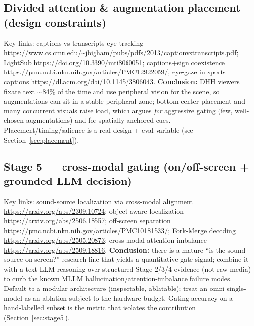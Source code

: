\documentclass[11pt,a4paper]{article}
\begin{document}
\subsection*{Divided attention \& augmentation placement (design constraints)}
Key links: captions vs transcripts eye-tracking
\url{https://www.cs.cmu.edu/~jbigham/pubs/pdfs/2013/captionvstranscripts.pdf}; LightSub
\url{https://doi.org/10.3390/mti8060051}; captions+sign coexistence
\url{https://pmc.ncbi.nlm.nih.gov/articles/PMC12922059/}; eye-gaze in sports captions
\url{https://dl.acm.org/doi/10.1145/3806043}.
\textbf{Conclusion:} DHH viewers fixate text $\sim$84\% of the time and use peripheral vision for the
scene, so augmentations can sit in a stable peripheral zone; bottom-center placement and many
concurrent visuals raise load, which argues \emph{for} aggressive gating (few, well-chosen
augmentations) and for spatially-anchored cues. Placement/timing/salience is a real design + eval
variable (see Section~\ref{sec:placement}).

\subsection*{Stage 5 --- cross-modal gating (on/off-screen + grounded LLM decision)}
Key links: sound-source localization via cross-modal alignment \url{https://arxiv.org/abs/2309.10724};
object-aware localization \url{https://arxiv.org/abs/2506.18557}; off-screen separation
\url{https://pmc.ncbi.nlm.nih.gov/articles/PMC10181533/}; Fork-Merge decoding
\url{https://arxiv.org/abs/2505.20873}; cross-modal attention imbalance
\url{https://arxiv.org/abs/2509.18816}.
\textbf{Conclusion:} there is a mature ``is the sound source on-screen?'' research line that yields a
quantitative gate signal; combine it with a text LLM reasoning over structured Stage-2/3/4 evidence
(not raw media) to curb the known MLLM hallucination/attention-imbalance failure modes. Default to a
modular architecture (inspectable, ablatable); treat an omni single-model as an ablation subject to
the hardware budget. Gating accuracy on a hand-labelled subset is the metric that isolates the
contribution (Section~\ref{sec:stage5}).
\normalsize
\end{document}
